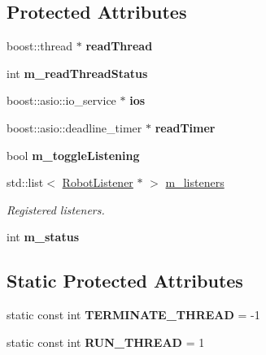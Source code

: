 \subsection*{Protected Attributes}
\begin{DoxyCompactItemize}
\item 
\hypertarget{class_robot_a7f81941312c87b38ef5c60f02d565bcb}{}boost\+::thread $\ast$ {\bfseries read\+Thread}\label{class_robot_a7f81941312c87b38ef5c60f02d565bcb}

\item 
\hypertarget{class_robot_ac6e92828eb711facd7fe88fa9e80961c}{}int {\bfseries m\+\_\+read\+Thread\+Status}\label{class_robot_ac6e92828eb711facd7fe88fa9e80961c}

\item 
\hypertarget{class_robot_aa8835ee41157aeab028a0aaeff133890}{}boost\+::asio\+::io\+\_\+service $\ast$ {\bfseries ios}\label{class_robot_aa8835ee41157aeab028a0aaeff133890}

\item 
\hypertarget{class_robot_a1adb110a11b739f6627dcf4ca8798817}{}boost\+::asio\+::deadline\+\_\+timer $\ast$ {\bfseries read\+Timer}\label{class_robot_a1adb110a11b739f6627dcf4ca8798817}

\item 
\hypertarget{class_robot_a379696f4a6eb66246569e3833fc2f271}{}bool {\bfseries m\+\_\+toggle\+Listening}\label{class_robot_a379696f4a6eb66246569e3833fc2f271}

\item 
\hypertarget{class_robot_a7c1c1ec2aa764902fe2cbe814f612df9}{}std\+::list$<$ \hyperlink{class_robot_listener}{Robot\+Listener} $\ast$ $>$ \hyperlink{class_robot_a7c1c1ec2aa764902fe2cbe814f612df9}{m\+\_\+listeners}\label{class_robot_a7c1c1ec2aa764902fe2cbe814f612df9}

\begin{DoxyCompactList}\small\item\em Registered listeners. \end{DoxyCompactList}\item 
\hypertarget{class_robot_aefb0abbfc6681d039e188892c137d689}{}int {\bfseries m\+\_\+status}\label{class_robot_aefb0abbfc6681d039e188892c137d689}

\end{DoxyCompactItemize}
\subsection*{Static Protected Attributes}
\begin{DoxyCompactItemize}
\item 
\hypertarget{class_robot_af6a64b83d24e0f46636946e9a0a0ccd3}{}static const int {\bfseries T\+E\+R\+M\+I\+N\+A\+T\+E\+\_\+\+T\+H\+R\+E\+A\+D} = -\/1\label{class_robot_af6a64b83d24e0f46636946e9a0a0ccd3}

\item 
\hypertarget{class_robot_a30926b9d988efb171a32cb1855bfa594}{}static const int {\bfseries R\+U\+N\+\_\+\+T\+H\+R\+E\+A\+D} = 1\label{class_robot_a30926b9d988efb171a32cb1855bfa594}

\end{DoxyCompactItemize}


